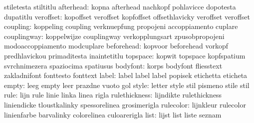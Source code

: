                            stiletesta                stiltitlu
                afterhead: kopna                     afterhead
                           nachkopf                  pohlavicce
                           dopotesta                 dupatitlu
                veroffset: kopoffset                 veroffset
                           kopfoffset                offsethlavicky
                           veroffset                 veroffset %
                 coupling: koppeling                 coupling
                           verknuepfung              propojeni
                           accoppiamento             cuplare
              couplingway: koppelwijze               couplingway
                           verkopplungsart           zpusobpropojeni
                           modoaccoppiamento         modcuplare
               beforehead: kopvoor                   beforehead
                           vorkopf                   predhlavickou
                           primaditesta              inaintetitlu
                 topspace: kopwit                    topspace
                           kopfspatium               svrchnimezera
                           spaziocima                spatiusus
                 bodyfont: korps                     bodyfont
                           fliesstext                zakladnifont
                           fonttesto                 fonttext
                    label: label                     label
                           label                     popisek
                           etichetta                 eticheta
                    empty: leeg                      empty
                           leer                      prazdne
                           vuoto                     gol
                    style: letter                    style
                           stil                      pismeno
                           stile                     stil
                     rule: lijn                      rule
                           linie                     linka
                           linea                     rigla
            rulethickness: lijndikte                 rulethickness
                           liniendicke               tloustkalinky
                           spessorelinea             grosimerigla
                rulecolor: lijnkleur                 rulecolor
                           linienfarbe               barvalinky
                           colorelinea               culoarerigla
                     list: lijst                     list
                           liste                     seznam
